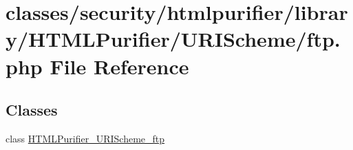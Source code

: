 \hypertarget{ftp_8php}{\section{classes/security/htmlpurifier/library/\+H\+T\+M\+L\+Purifier/\+U\+R\+I\+Scheme/ftp.php File Reference}
\label{ftp_8php}
}
\subsection*{Classes}
\begin{DoxyCompactItemize}
\item 
class \hyperlink{classHTMLPurifier__URIScheme__ftp}{H\+T\+M\+L\+Purifier\+\_\+\+U\+R\+I\+Scheme\+\_\+ftp}
\end{DoxyCompactItemize}
